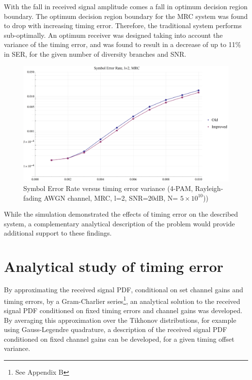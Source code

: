 With the fall in received signal amplitude comes a fall in optimum decision region boundary. The optimum decision region boundary for the MRC system was found to drop with increasing timing error. Therefore, the traditional system performs sub-optimally. An optimum receiver was designed taking into account the variance of the timing error, and was found to result in a decrease of up to 11\% in SER, for the given number of diversity branches and SNR.

\begin{figure}[htbp]
\centering
\includegraphics[width=\linewidth]{MRC2_SER.png}
\caption[MRC Symbol Error Rate]{Symbol Error Rate versus timing error variance (4-PAM, Rayleigh-fading AWGN channel, MRC, l=2, SNR=20dB, N= $5 \times 10^{10}$))}
\end{figure}

While the simulation demonstrated the effects of timing error on the described system, a complementary analytical description of the problem would provide additional support to these findings.

\section{Analytical study of timing error}

By approximating the received signal PDF, conditional on set channel gains and timing errors, by a Gram-Charlier series\footnote{See Appendix B}, an analytical solution to the received signal PDF conditioned on fixed timing errors and channel gains was developed. By averaging this approximation over the Tikhonov distributions, for example using Gauss-Legendre quadrature, a description of the received signal PDF conditioned on fixed channel gains can be developed, for a given timing offset variance.

